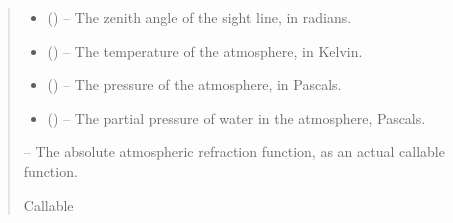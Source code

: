 \documentclass[letterpaper,11pt,english]{sphinxmanual}
\begin{document}
\begin{savenotes}
\begin{fulllineitems}
\begin{quote}
\begin{description}
\begin{itemize}
\item {} 
\sphinxAtStartPar
{} () – The zenith angle of the sight line, in radians.

\item {} 
\sphinxAtStartPar
{} () – The temperature of the atmosphere, in Kelvin.

\item {} 
\sphinxAtStartPar
{} () – The pressure of the atmosphere, in Pascals.

\item {} 
\sphinxAtStartPar
{} () – The partial pressure of water in the atmosphere, Pascals.

\end{itemize}

\sphinxAtStartPar
{} – The absolute atmospheric refraction function, as an actual callable
function.

\sphinxAtStartPar
Callable

\end{description}\end{quote}

\end{fulllineitems}\end{savenotes}

\end{document}
